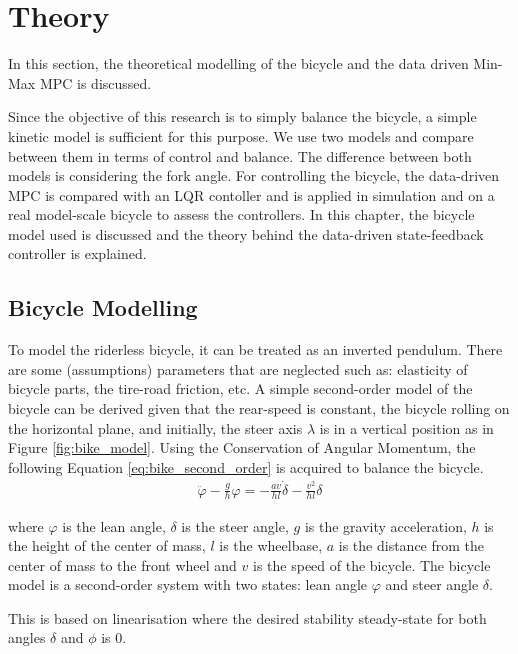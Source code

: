 \chapter{Theory}
\label{chap:theory}
In this section, the theoretical modelling of the bicycle and the data driven Min-Max MPC is discussed.

Since the objective of this research is to simply balance the bicycle, a simple kinetic model is sufficient for this purpose. We use two models and compare between them in terms of control and balance.
The difference between both models is considering the fork angle.
For controlling the bicycle, the data-driven MPC is compared with an LQR contoller and is applied in simulation and on a real model-scale bicycle to assess the controllers. In this chapter, the bicycle model used is discussed and the theory behind the data-driven state-feedback controller is explained.

\section{Bicycle Modelling}
\label{sec:bike_modelling}

	To model the riderless bicycle, it can be treated as an inverted pendulum. There are some (assumptions) parameters that are neglected such as: elasticity of bicycle parts, the tire-road friction, etc. A simple second-order model of the bicycle can be derived given that the rear-speed is constant, the bicycle rolling on the horizontal plane, and initially, the steer axis $\lambda$ is in a vertical position as in Figure \ref{fig:bike_model}. Using the Conservation of Angular Momentum, the following Equation \ref{eq:bike_second_order} is acquired to balance the bicycle.
	\begin{align*}
		\ddot{\varphi} - \frac{g}{h} \varphi = - \frac{av}{hl} \dot{\delta} - \frac{v^2}{h l} \delta
	\end{align*}

	where $\varphi$ is the lean angle, $\delta$ is the steer angle, $g$ is the gravity acceleration, $h$ is the height of the center of mass, $l$ is the wheelbase, $a$ is the distance from the center of mass to the front wheel and $v$ is the speed of the bicycle. The bicycle model is a second-order system with two states: lean angle $\varphi$ and steer angle $\delta$.

	This is based on linearisation where the desired stability steady-state for both angles $\delta$ and $\phi$ is 0.

